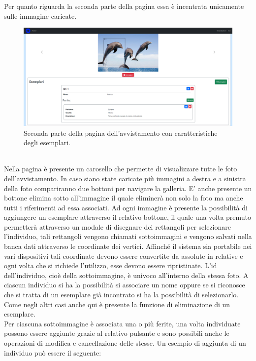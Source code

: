 \documentclass[a4paper,final,12pt]{report}
\begin{document}
\newpage
Per quanto riguarda la seconda parte della pagina essa è incentrata unicamente sulle immagine caricate.
\begin{figure}[hbtp]
\centering
\includegraphics[scale=0.31]{img_concettuale/avvistamentoPAG2.png}
\caption{Seconda parte della pagina dell'avvistamento con caratteristiche degli esemplari.}
\end{figure}
\\Nella pagina è presente un carosello che permette di visualizzare tutte le foto dell'avvistamento. In caso siano state caricate più immagini a destra e a sinistra della foto compariranno due bottoni per navigare la galleria. E' anche presente un bottone elimina sotto all'immagine il quale eliminerà non solo la foto ma anche tutti i riferimenti ad essa associati.
Ad ogni immagine è presente la possibilità di aggiungere un esemplare attraverso il relativo bottone, il quale una volta premuto permetterà attraverso un modale di disegnare dei rettangoli per selezionare l'individuo, tali rettangoli vengono chiamati sottoimmagini e vengono salvati nella banca dati attraverso le coordinate dei vertici. Affinché il sistema sia portabile nei vari dispositivi tali coordinate devono essere convertite da assolute in relative e ogni volta che si richiede l'utilizzo, esse devono essere ripristinate. L'id dell'individuo, cioè della sottoimmagine, è univoco all'interno della stessa foto. A ciascun individuo si ha la possibilità si associare un nome oppure se si riconosce che si tratta di un esemplare già incontrato si ha la possibilità di selezionarlo. Come negli altri casi anche qui è presente la funzione di eliminazione di un esemplare.\\
Per ciascuna sottoimmagine è associata una o più ferite, una volta individuate possono essere aggiunte grazie al relativo pulsante e sono possibili anche le operazioni di modifica e cancellazione delle stesse.
Un esempio di aggiunta di un individuo può essere il seguente:
\end{document}
